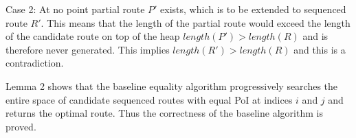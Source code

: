 Case 2: At no point partial route $P'$ exists, which is to be extended to sequenced route $R'$. This means that the length of the partial route would exceed the length of the candidate route on top of the heap $length(P') > length(R)$ and is therefore never generated. This implies $length(R') > length(R)$ and this is a contradiction.

Lemma 2 shows that the baseline equality algorithm progressively searches the entire space of candidate sequenced routes with equal PoI at indices $i$ and $j$ and returns the optimal route. Thus the correctness of the baseline algorithm is proved.